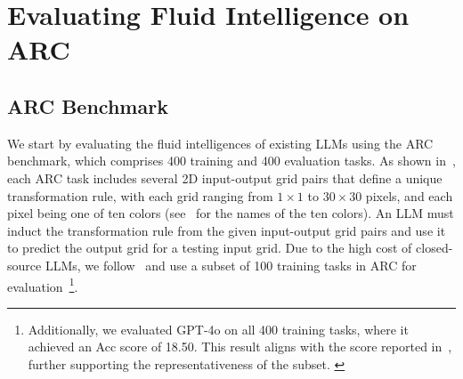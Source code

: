 \iffalse
\begin{figure}
    \centering
    \texttt{[image: figures/figure2.pdf]}
    \caption{An example of the input format conversion. We follow~\citet{wang2023hypothesis} to convert 2D input grids into matrices (represented by NumPy arrays), where each pixel is transformed into a number denoting a specific color (e.g., ``8'' denotes blue and ``2'' denotes red).\lemao{Remove this Figure.}} 
    \label{fig:example matrix input}
\end{figure}
\fi



\section{Evaluating Fluid Intelligence on ARC}
\label{evaluate llm on arc}

\subsection{ARC Benchmark}
\label{sec:arc setting}
We start by evaluating the fluid intelligences of existing LLMs using the ARC benchmark, which comprises 400 training and 400 evaluation tasks. As shown in~, each ARC task includes several 2D input-output grid pairs that define a unique transformation rule, with each grid ranging from $1 \times 1$ to $30 \times 30$ pixels, and each pixel being one of ten colors (see~ for the names of the ten colors). An LLM must induct the transformation rule from the given input-output grid pairs and use it to predict the output grid for a testing input grid. Due to the high cost of closed-source LLMs, we follow~\citet{wang2023hypothesis} and use a subset of 100 training tasks in ARC for evaluation~\footnote{\scriptsize{Additionally, we evaluated GPT-4o on all 400 training tasks, where it achieved an Acc score of 18.50. This result aligns with the score reported in~, further supporting the representativeness of the subset.
}}.  




